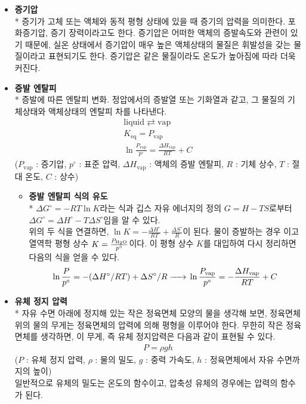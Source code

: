 \documentclass[a4paper,10pt]{article}
\begin{document}
	\begin{itemize}
		\item {\bf 증기압} \\*
		증기가 고체 또는 액체와 동적 평형 상태에 있을 때 증기의 압력을 의미한다. 포화증기압, 증기 장력이라고도 한다. 증기압은 어떠한 액체의 증발속도와 관련이 있기 때문에, 실온 상태에서 증기압이 매우 높은 액체상태의 물질은 휘발성을 갖는 물질이라고 표현되기도 한다. 증기압은 같은 물질이라도 온도가 높아짐에 따라 더욱 커진다.
		\item {\bf 증발 엔탈피} \\*
		증발에 따른 엔탈피 변화. 정압에서의 증발열 또는 기화열과 같고, 그 물질의 기체상태와 액체상태의 엔탈피 차를 나타낸다.
		\begin{gather*}
			\mathrm{liquid} \rightleftarrows \mathrm{vap} \\
			K_{\mathrm{eq}} = P_{\mathrm{vap}} \\
			\ln \frac{P_{\mathrm{vap}}}{p^{\circ}} = \frac{\Delta H_{\mathrm{vap}}}{RT} + C
		\end{gather*}
		($P_{\mathrm{vap}}$ : 증기압, $p^{\circ}$ : 표준 압력, $\Delta H_{\mathrm{vap}}$ : 액체의 증발 엔탈피, $R$ : 기체 상수, $T$ : 절대 온도, $C$ : 상수)
		\begin{itemize}
			\item {\bf 증발 엔탈피 식의 유도} \\*
			$\Delta G^{\circ} = -RT \ln K$라는 식과 깁스 자유 에너지의 정의 $G = H - TS$로부터 $\Delta G^{\circ} = \Delta H^{\circ} - T \Delta S^{\circ}$임을 알 수 있다. \\
			위의 두 식을 연결하면, $\ln K = -\frac{\Delta H^{\circ}}{RT} + \frac{\Delta S^{\circ}}{R}$이 된다.
			물이 증발하는 경우 이고 열역학 평형 상수 $K = \frac{P_{\ce{H_{2}O}}}{p^{\circ}}$이다. 이 평형 상수 $K$를 대입하여 다시 정리하면 다음의 식을 얻을 수 있다.
			\begin{gather*}
				\ln \frac{P}{p^{\circ}} = -(\Delta H^{\circ}/RT) + \Delta S^{\circ}/R \ce{->} \ln \frac{P_{\mathrm{vap}}}{p^{\circ}} = -\frac{\Delta H_{\mathrm{vap}}}{RT} + C
			\end{gather*}
		\end{itemize}
		
		\item {\bf 유체 정지 압력} \\*
		자유 수면 아래에 정지해 있는 작은 정육면체 모양의 물을 생각해 보면, 정육면체 위의 물의 무게는 정육면체의 압력에 의해 평형을 이루어야 한다. 무한히 작은 정육면체를 생각하면, 이 무게, 즉 유체 정지압력은 다음과 같이 표현될 수 있다.
		\begin{gather*}
			P = \rho gh
		\end{gather*}
		($P$ : 유체 정지 압력, $\rho$ : 물의 밀도, $g$ : 중력 가속도, $h$ : 정육면체에서 자유 수면까지의 높이) \\
		일반적으로 유체의 밀도는 온도의 함수이고, 압축성 유체의 경우에는 압력의 함수가 된다.
		
	\end{itemize}
	
\end{document}
